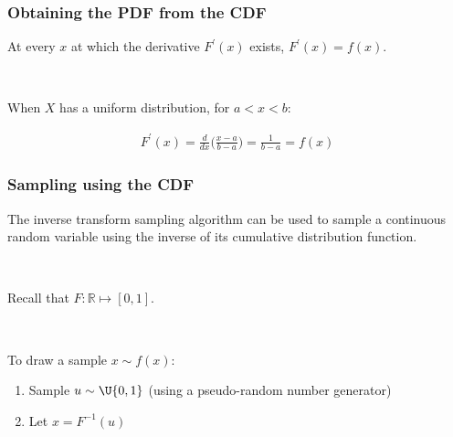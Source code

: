 \documentclass{beamer}
\begin{document}
\begin{frame}
\frametitle{Obtaining the PDF from the CDF}

At every $x$ at which the derivative $F^\prime(x)$ exists, $F^\prime(x) = f(x)$.

\

\begin{examples}
When $X$ has a uniform distribution, for $a < x < b$:

\vspace{-0.3cm}

\begin{align*}
F^\prime(x) = \frac{d}{dx}\bigg(\frac{x-a}{b-a}\bigg) = \frac{1}{b-a} = f(x)
\end{align*}
\end{examples}


\end{frame}

\begin{frame}
\frametitle{Sampling using the CDF}

The inverse transform sampling algorithm can be used to sample a continuous random variable
using the inverse of its cumulative distribution function.

\

Recall that $F: \mathbb{R} \mapsto [0, 1]$.

\ 

To draw a sample $x \sim f(x)$:
\begin{enumerate}
    \item Sample $u \sim \U{0,1}$ (using a pseudo-random number generator)
    \item Let $x = F^{-1}(u)$
\end{enumerate}

\end{frame}
\end{document}
